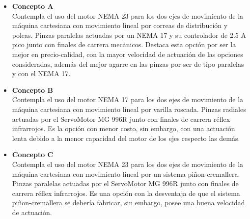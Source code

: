 \begin{itemize}
	
	\item \textbf{Concepto A}\\
	Contempla el uso del motor NEMA 23 para los dos ejes de movimiento de la máquina cartesiana con movimiento lineal por correas de distribución y poleas. Pinzas paralelas actuadas por un NEMA 17 y su controlador de 2.5 A pico junto con finales de carrera mecánicos. Destaca esta opción por ser la mejor en precio-calidad, con la mayor velocidad de actuación de las opciones consideradas, además del mejor agarre en las pinzas por ser de tipo paralelas y con el NEMA 17. 
	\item \textbf{Concepto B}\\
	Contempla el uso del motor NEMA 17 para los dos ejes de movimiento de la máquina cartesiana con movimiento lineal por varilla roscada. Pinzas radiales actuadas por el ServoMotor MG 996R junto con finales de carrera réflex infrarrojos. Es la opción con menor costo, sin embargo, con una actuación lenta debido a la menor capacidad del motor de los ejes respecto las demás.
	\item \textbf{Concepto C}\\
	Contempla el uso del motor NEMA 23 para los dos ejes de movimiento de la máquina cartesiana con movimiento lineal por un sistema piñon-cremallera. Pinzas paralelas actuadas por el ServoMotor MG 996R junto con finales de carrera réflex infrarrojos. Es una opción con la desventaja de que el sistema piñon-cremallera se debería fabricar, sin embargo, posee una buena velocidad de actuación. 
\end{itemize}

